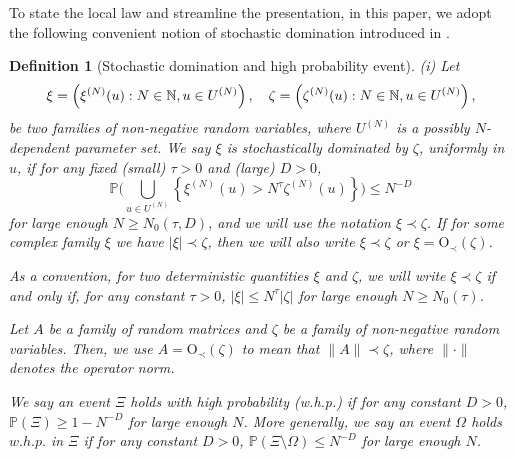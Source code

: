 \documentclass[10pt,reqno]{amsart}
\numberwithin{equation}{section}
\numberwithin{figure}{section}
\theoremstyle{plain} %
\newtheorem{definition}[theorem]{Definition}
\theoremstyle{definition} %
\renewcommand{\P}{\mathbb{P}}
\renewcommand{\epsilon}{\varepsilon}
\newcommand{\OO}{\mathrm{O}}
\numberwithin{equation}{section}
\begin{document}
To state the local law and streamline the presentation, in this paper, we adopt the following convenient notion of stochastic domination introduced in \cite{Average_fluc}. 


\begin{definition}[Stochastic domination and high probability event]\label{stoch_domination}
	{\rm{(i)}} Let
	\[\xi=\left(\xi^{(N)}(u):N\in\mathbb N, u\in U^{(N)}\right),\hskip 10pt \zeta=\left(\zeta^{(N)}(u):N\in\mathbb N, u\in U^{(N)}\right),\]
	be two families of non-negative random variables, where $U^{(N)}$ is a possibly $N$-dependent parameter set. We say $\xi$ is stochastically dominated by $\zeta$, uniformly in $u$, if for any fixed (small) $\tau>0$ and (large) $D>0$, 
	\[\mathbb P\bigg(\bigcup_{u\in U^{(N)}}\left\{\xi^{(N)}(u)>N^\tau\zeta^{(N)}(u)\right\}\bigg)\le N^{-D}\]
	for large enough $N\ge N_0(\tau, D)$, and we will use the notation $\xi\prec\zeta$. 
	If for some complex family $\xi$ we have $|\xi|\prec\zeta$, then we will also write $\xi \prec \zeta$ or $\xi=\OO_\prec(\zeta)$. 
	
	\vspace{5pt}
	 As a convention, for two deterministic quantities $\xi$ and $\zeta$, we will write $\xi\prec\zeta$ if and only if, for any constant $\tau>0$, $|\xi|\le N^\tau |\zeta|$ for large enough $N\ge N_0(\tau)$. 

 \vspace{5pt}
	 Let $A$ be a family of random matrices and $\zeta$ be a family of non-negative random variables. Then, we use $A=\OO_\prec(\zeta)$ to mean that $\|A\|\prec \zeta$, where $\|\cdot\|$ denotes the operator norm. 
	
	\vspace{5pt}
	 We say an event $\Xi$ holds with high probability (w.h.p.) if for any constant $D>0$, $\mathbb P(\Xi)\ge 1- N^{-D}$ for large enough $N$. More generally, we say an event $\Omega$ holds $w.h.p.$ in $\Xi$ if for any constant $D>0$,
	$\P( \Xi\setminus \Omega)\le N^{-D}$ for large enough $N$.
\end{definition}
\end{document}
